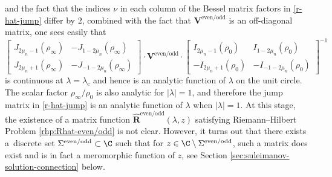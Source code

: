 and the fact that the indices $\nu$ in each column of the Bessel matrix factors in \eqref{r-hat-jump} differ by $2$, combined with the fact that $\mathbf{V}^\mathrm{even/odd}$ is an off-diagonal matrix, one sees easily that
\[
\begin{bmatrix}J_{2\mu_n - 1}(\rho_\infty) & -J_{1- 2\mu_n}(\rho_\infty)\\
 J_{2\mu_n +1}(\rho_\infty) & -J_{-1-2\mu_n}(\rho_\infty)\end{bmatrix}\cdot\mathbf{V}^\mathrm{even/odd}
 \cdot \begin{bmatrix}I_{2\mu_n - 1}(\rho_0) & I_{1- 2\mu_n}(\rho_0)\\
 -I_{2\mu_n +1}(\rho_0) & -I_{-1-2\mu_n}(\rho_0)\end{bmatrix}^{-1}
\]
is continuous at $\lambda=\lambda_\mathrm{c}$ and hence is an analytic function of $\lambda$ on the unit circle. The scalar factor $\rho_\infty/\rho_0$ is also analytic for $|\lambda|=1$, and therefore the jump matrix in \eqref{r-hat-jump} is an analytic function of $\lambda$ when $|\lambda|=1$. At this stage, the existence of a matrix function $\hat{\mathbf{R}}^\mathrm{even/odd}(\lambda, z)$ satisfying Riemann--Hilbert Problem \ref{rhp:Rhat-even/odd} is not clear. However, it turns out that there exists a~discrete set $\Sigma^{\mathrm{even/odd}} \subset \C$ such that for $z \in \C \setminus \Sigma^{\mathrm{even/odd}}$, such a matrix does exist and is in fact a meromorphic function of $z$, see Section \ref{sec:suleimanov-solution-connection} below.

